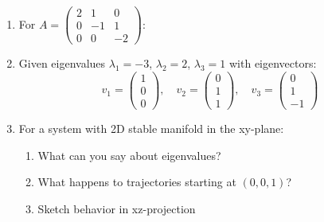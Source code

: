 \documentclass[12pt]{article}
\begin{document}
\begin{enumerate}[resume]
\item For $A = \begin{pmatrix} 2 & 1 & 0 \\ 0 & -1 & 1 \\ 0 & 0 & -2 \end{pmatrix}$:

\item Given eigenvalues $\lambda_{1} = -3$, $\lambda_{2} = 2$, $\lambda_{3} = 1$ with eigenvectors:
$$v_{1} = \begin{pmatrix} 1 \\ 0 \\ 0 \end{pmatrix}, \quad v_{2} = \begin{pmatrix} 0 \\ 1 \\ 1 \end{pmatrix}, \quad v_{3} = \begin{pmatrix} 0 \\ 1 \\ -1 \end{pmatrix}$$

\item For a system with 2D stable manifold in the xy-plane:
\begin{enumerate}[label=(\alph*)]
    \item What can you say about eigenvalues?
    \item What happens to trajectories starting at $(0,0,1)$?
    \item Sketch behavior in xz-projection
\end{enumerate}


\end{enumerate}
\end{document}
